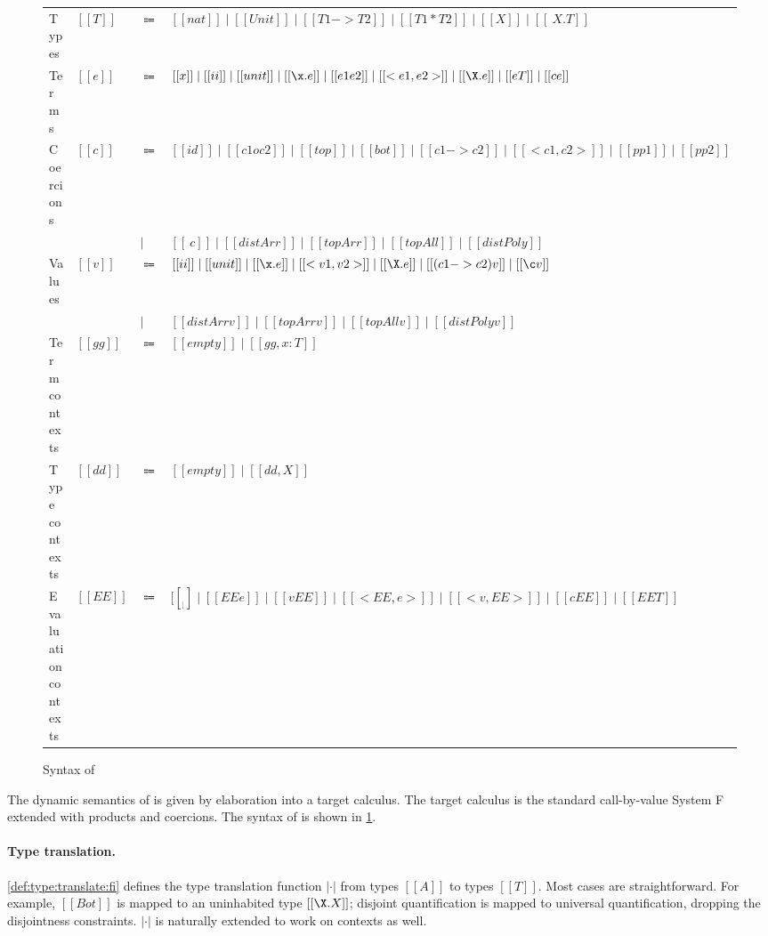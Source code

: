 \begin{figure}[t]
  \centering
\begin{tabular}{llll} \toprule
  Types & $[[T]]$ & $\Coloneqq$ & $[[nat]] \mid [[Unit]] \mid [[T1 -> T2]]  \mid [[T1 * T2]] \mid [[X]] \mid [[\ X . T]]$\\
  Terms & $[[e]]$ & $\Coloneqq$ & $[[x]] \mid [[ii]] \mid [[unit]] \mid [[\x . e]] \mid [[e1 e2]] \mid [[< e1 , e2>]] \mid [[\X . e]] \mid [[ e T ]] \mid [[c e]]$ \\
  Coercions & $[[c]]$ & $\Coloneqq$ & $[[id]] \mid [[c1 o c2]] \mid [[top]] \mid [[bot]] \mid [[c1 -> c2]] \mid [[< c1 , c2 >]] \mid [[pp1]] \mid [[pp2]] $ \\
  & & $\mid$ & $ [[\ c]] \mid [[distArr]] \mid [[topArr]] \mid [[topAll]] \mid [[distPoly]] $ \\
  Values & $[[v]]$ & $\Coloneqq$ & $[[ii]] \mid [[unit]] \mid [[\x . e]] \mid [[< v1 , v2>]] \mid [[\X . e]] \mid [[ (c1 -> c2) v ]] \mid [[\c v]]  $ \\
  & & $\mid$ & $ [[distArr v]] \mid [[topArr v]] \mid [[topAll v]] \mid [[distPoly v]]  $ \\
  Term contexts & $[[gg]]$ & $\Coloneqq$ &  $[[empty]] \mid [[gg , x : T]] $ \\
  Type contexts & $[[dd]] $ & $\Coloneqq $ & $[[empty]] \mid [[dd , X]] $  \\
  Evaluation contexts & $[[EE]]$ & $\Coloneqq$ &  $  [[__]] \mid [[EE e]] \mid [[v EE]] \mid [[ < EE , e >  ]] \mid [[ < v , EE > ]] \mid [[ c EE  ]] \mid [[ EE T  ]]  $ \\ \bottomrule
\end{tabular}
\caption{Syntax of \tnamee}
\label{fig:syntax:fco}
\end{figure}


The dynamic semantics of \fnamee is given by elaboration into
a target calculus. The target calculus \tnamee is the standard call-by-value
System F extended with products and coercions. The syntax of \tnamee is shown in
\cref{fig:syntax:fco}.

\paragraph{Type translation.}

\cref{def:type:translate:fi} defines the type translation function $| \cdot |$
from \fnamee types $[[A]]$ to \tnamee types $[[T]]$. Most cases are
straightforward. For example, $[[Bot]]$ is mapped to an uninhabited
type $[[\X . X]]$; disjoint quantification is mapped to universal
quantification, dropping the disjointness constraints. $| \cdot |$ is
naturally extended to work on contexts as well.

